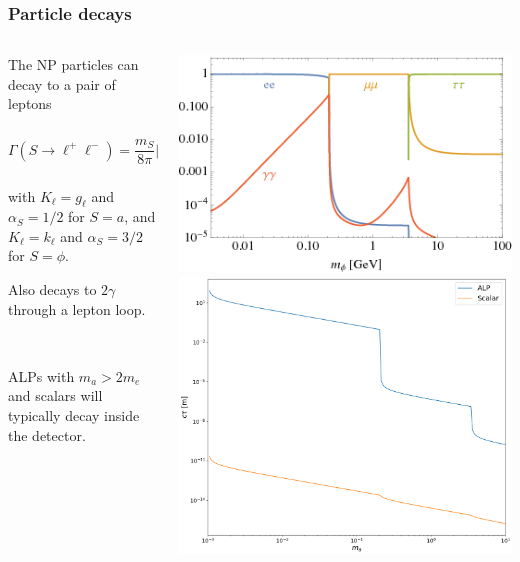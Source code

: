 \documentclass[mathserif, 10pt, aspectratio=169]{beamer}
\begin{document}
\begin{frame}\frametitle{Particle decays}
    
    \begin{columns}

        \begin{column}{0.6\textwidth}
            The NP particles can decay to a pair of leptons

            $$\Gamma(S \to \ell^+\ell^-) = \frac{m_S}{8\pi} |K_\ell|^2 \left(1-\frac{4 m_\ell^2}{m_S^2}\right)^{\alpha_S}\,,$$

            {\small with $K_\ell = g_\ell$ and $\alpha_S = 1/2$ for $S=a$, and $K_\ell = k_\ell$ and $\alpha_S = 3/2$ for $S=\phi$.}

            Also decays to $2\gamma$ through a lepton loop.

            ~

            ALPs with $m_a > 2 m_e$ and scalars will typically decay inside the detector.
        \end{column}
        \begin{column}{0.38\textwidth}
            \includegraphics[width=\columnwidth]{figures/BR_S.png} \\
            \includegraphics[width=\columnwidth]{figures/properlength.png}
        \end{column}
    \end{columns}
\end{frame}
\end{document}
